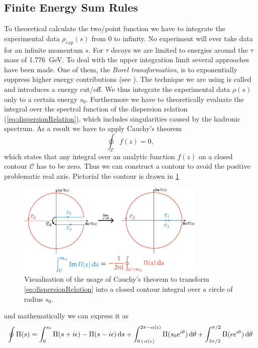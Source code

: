 \documentclass[../../index.tex]{subfiles}
\begin{document}
\subsection{Finite Energy Sum Rules}
To theoretical calculate the two\-/point function we have to integrate the
experimental data \(\rho_{exp}(s)\) from 0 to infinity. No experiment will ever
take data for an infinite momentum \(s\). For \(\tau\) decays we are limited to
energies around the \(\tau\) mass of \SI{1.776}{\giga\eV}. To deal with the
upper integration limit several approaches have been made. One of them, the
\textit{Borel transformation}, is to exponentially suppress higher energy
contributions (see \cite{Weinberg1996,Rafael1997}). The technique we are using
is called  and introduces a energy
cut\-/off. We thus integrate the experimental data \(\rho(s)\) only to a certain
energy \(s_0\). Furthermore we have to theoretically evaluate the integral over
the spectral function of the dispersion relation (\cref{eq:dispersionRelation}),
which includes singularities caused by the hadronic spectrum. As a result
we have to apply Cauchy's theorem
\begin{equation}
  \oint_{\mathcal{C}} f(z) = 0,
\end{equation}
which states that any integral over an analytic function \(f(z)\) on a closed
contour \(\mathcal{C}\) has to be zero. Thus we can construct a contour to avoid
the positive problematic real axis. Pictorial the contour is drawn in
\cref{fig:theoreticalTwoPointFunction}
\begin{figure}
  \centering
  \includegraphics[width=0.8\textwidth]{./images/rTauCauchysTheorem.eps}
  \caption{Visualisation of the usage of Cauchy's theorem to transform
    \cref{eq:dispersionRelation} into a closed contour integral over a circle of
    radius $s_0$.}
  \label{fig:theoreticalTwoPointFunction}
\end{figure}
and mathematically we can express it as
\begin{equation}
  \label{eq:sumRulesCauchysTheorem}
  \oint \Pi(s) = \int_0^{s_0} \Pi(s+i\epsilon)-\Pi(s-i\epsilon)\dif s
  + \int_{0+\alpha(\epsilon)}^{2\pi-\alpha(\epsilon)}\Pi(s_0e^{i\theta})\dif \theta + \int_{3\pi/2}^{\pi/2}\Pi(\epsilon e^{i\theta})\dif \theta 
\end{equation}
\end{document}

